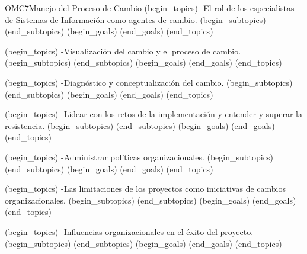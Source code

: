 \begin{BKL2}{OMC7}{Manejo del Proceso de Cambio}
(begin_topics)
-El rol de los especialistas de Sistemas de Información como agentes de cambio.
(begin_subtopics)
(end_subtopics)
(begin_goals)
(end_goals)
(end_topics)

(begin_topics)
-Visualización del cambio y el proceso de cambio.
(begin_subtopics)
(end_subtopics)
(begin_goals)
(end_goals)
(end_topics)

(begin_topics)
-Diagnóstico y conceptualización del cambio.
(begin_subtopics)
(end_subtopics)
(begin_goals)
(end_goals)
(end_topics)

(begin_topics)
-Lidear con los retos de la implementación y entender y superar la resistencia.
(begin_subtopics)
(end_subtopics)
(begin_goals)
(end_goals)
(end_topics)

(begin_topics)
-Administrar políticas organizacionales.
(begin_subtopics)
(end_subtopics)
(begin_goals)
(end_goals)
(end_topics)

(begin_topics)
-Las limitaciones de los proyectos como iniciativas de cambios organizacionales.
(begin_subtopics)
(end_subtopics)
(begin_goals)
(end_goals)
(end_topics)

(begin_topics)
-Influencias organizacionales en el éxito del proyecto.
(begin_subtopics)
(end_subtopics)
(begin_goals)
(end_goals)
(end_topics)

\end{BKL2}



